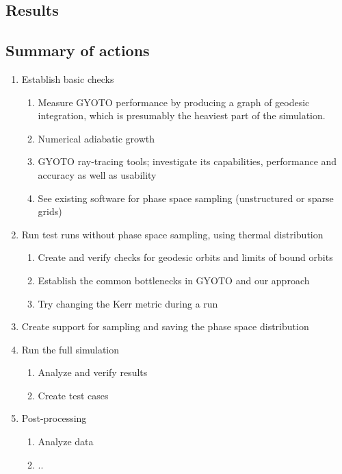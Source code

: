 \documentclass[12pt]{article}
\begin{document}
\subsection{Results}


\subsection{Summary of actions}


\begin{enumerate}
 \item Establish basic checks
 \begin{enumerate}
  \item Measure GYOTO performance by producing a graph of geodesic integration, which is presumably the heaviest part of the simulation.
  \item Numerical adiabatic growth \citep{Sadeghian_Ferrer_Will_2013}
  \item GYOTO ray-tracing tools; investigate its capabilities, performance and accuracy as well as usability
  \item See existing software for phase space sampling (unstructured or sparse grids)
 \end{enumerate}
 \item Run test runs without phase space sampling, using thermal distribution
 \begin{enumerate}
  \item Create and verify checks for geodesic orbits and limits of bound orbits
  \item Establish the common bottlenecks in GYOTO and our approach
  \item Try changing the Kerr metric during a run
 \end{enumerate}
 \item Create support for sampling and saving the phase space distribution
 \item Run the full simulation
 \begin{enumerate}
  \item Analyze and verify results
  \item Create test cases
 \end{enumerate}
 \item Post-processing
 \begin{enumerate}
  \item Analyze data
  \item ..
 \end{enumerate}
\end{enumerate}
\end{document}
